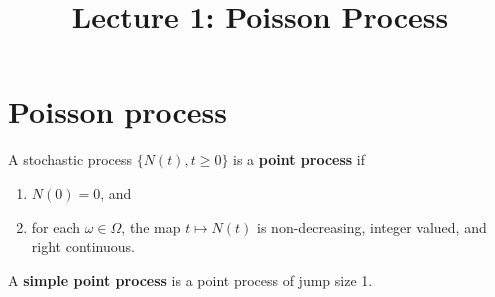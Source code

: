 \documentclass[a4paper,10pt,english]{article}
\title{Lecture 1: Poisson Process}
\author{}
\begin{document}
\maketitle

\section{Poisson process}
\begin{defn} A stochastic process $\{N(t), t\geqslant 0\}$ is a \textbf{point process} if
\begin{enumerate}
  \item $N(0) = 0$, and 
  \item for each $\omega \in \Omega$, the map $t\mapsto N(t)$ is non-decreasing, integer valued, and right continuous.%
\end{enumerate}
\end{defn} 
\begin{defn} A \textbf{simple point process} is a point process of jump size 1.
\end{defn}
\end{document}
